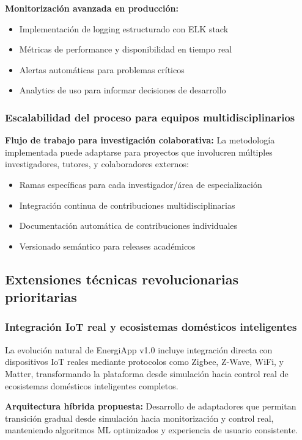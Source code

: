 \textbf{Monitorización avanzada en producción:}
\begin{itemize}
    \item Implementación de logging estructurado con ELK stack
    \item Métricas de performance y disponibilidad en tiempo real
    \item Alertas automáticas para problemas críticos
    \item Analytics de uso para informar decisiones de desarrollo
\end{itemize}

\subsubsection{Escalabilidad del proceso para equipos multidisciplinarios}

\textbf{Flujo de trabajo para investigación colaborativa:}
La metodología implementada puede adaptarse para proyectos que involucren múltiples investigadores, tutores, y colaboradores externos:

\begin{itemize}
    \item Ramas específicas para cada investigador/área de especialización
    \item Integración continua de contribuciones multidisciplinarias
    \item Documentación automática de contribuciones individuales
    \item Versionado semántico para releases académicos
\end{itemize}

\subsection{Extensiones técnicas revolucionarias prioritarias}

\subsubsection{Integración IoT real y ecosistemas domésticos inteligentes}

La evolución natural de EnergiApp v1.0 incluye integración directa con dispositivos IoT reales mediante protocolos como Zigbee, Z-Wave, WiFi, y Matter, transformando la plataforma desde simulación hacia control real de ecosistemas domésticos inteligentes completos.

\textbf{Arquitectura híbrida propuesta:} Desarrollo de adaptadores que permitan transición gradual desde simulación hacia monitorización y control real, manteniendo algoritmos ML optimizados y experiencia de usuario consistente.

